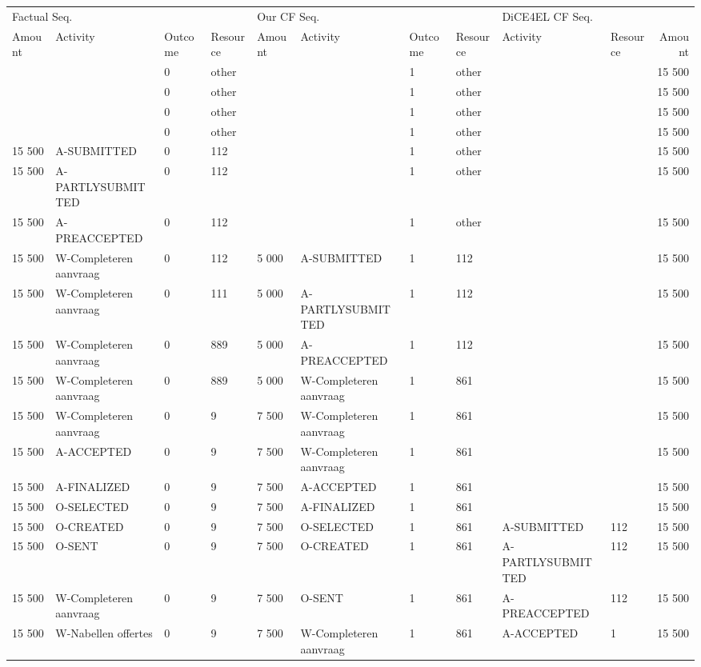 \begin{tabular}{llllllllllr}
\toprule
\multicolumn{4}{l}{Factual Seq.} & \multicolumn{4}{l}{Our CF Seq.} & \multicolumn{3}{l}{DiCE4EL CF Seq.} \\
Amount & Activity & Outcome & Resource & Amount & Activity & Outcome & Resource & Activity & Resource & Amount \\
\midrule
 &  & 0 & other &  &  & 1 & other &  &  & 15 500 \\
 &  & 0 & other &  &  & 1 & other &  &  & 15 500 \\
 &  & 0 & other &  &  & 1 & other &  &  & 15 500 \\
 &  & 0 & other &  &  & 1 & other &  &  & 15 500 \\
15 500 & A-SUBMITTED & 0 & 112 &  &  & 1 & other &  &  & 15 500 \\
15 500 & A-PARTLYSUBMITTED & 0 & 112 &  &  & 1 & other &  &  & 15 500 \\
15 500 & A-PREACCEPTED & 0 & 112 &  &  & 1 & other &  &  & 15 500 \\
15 500 & W-Completeren aanvraag & 0 & 112 & 5 000 & A-SUBMITTED & 1 & 112 &  &  & 15 500 \\
15 500 & W-Completeren aanvraag & 0 & 111 & 5 000 & A-PARTLYSUBMITTED & 1 & 112 &  &  & 15 500 \\
15 500 & W-Completeren aanvraag & 0 & 889 & 5 000 & A-PREACCEPTED & 1 & 112 &  &  & 15 500 \\
15 500 & W-Completeren aanvraag & 0 & 889 & 5 000 & W-Completeren aanvraag & 1 & 861 &  &  & 15 500 \\
15 500 & W-Completeren aanvraag & 0 & 9 & 7 500 & W-Completeren aanvraag & 1 & 861 &  &  & 15 500 \\
15 500 & A-ACCEPTED & 0 & 9 & 7 500 & W-Completeren aanvraag & 1 & 861 &  &  & 15 500 \\
15 500 & A-FINALIZED & 0 & 9 & 7 500 & A-ACCEPTED & 1 & 861 &  &  & 15 500 \\
15 500 & O-SELECTED & 0 & 9 & 7 500 & A-FINALIZED & 1 & 861 &  &  & 15 500 \\
15 500 & O-CREATED & 0 & 9 & 7 500 & O-SELECTED & 1 & 861 & A-SUBMITTED & 112 & 15 500 \\
15 500 & O-SENT & 0 & 9 & 7 500 & O-CREATED & 1 & 861 & A-PARTLYSUBMITTED & 112 & 15 500 \\
15 500 & W-Completeren aanvraag & 0 & 9 & 7 500 & O-SENT & 1 & 861 & A-PREACCEPTED & 112 & 15 500 \\
15 500 & W-Nabellen offertes & 0 & 9 & 7 500 & W-Completeren aanvraag & 1 & 861 & A-ACCEPTED & 1 & 15 500 \\

\end{tabular}
